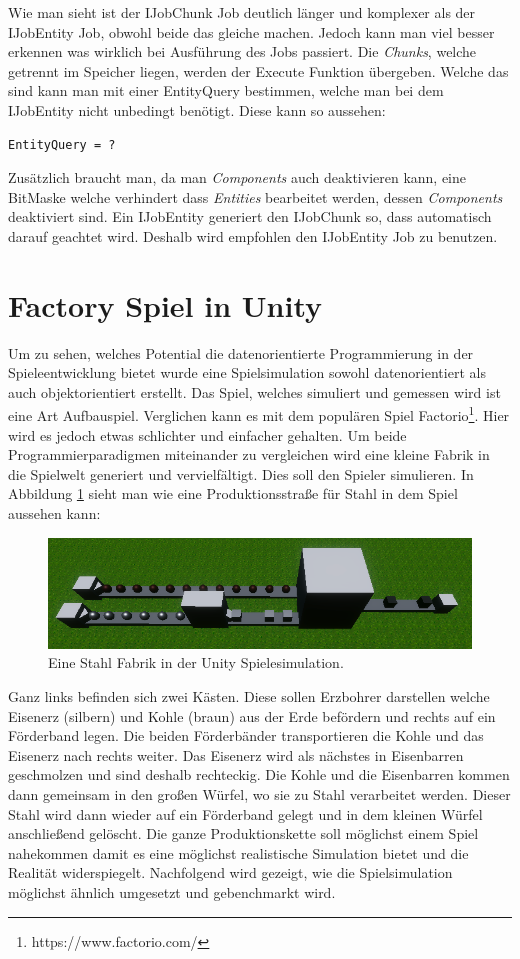 \documentclass[12pt, titlepage]{article}
\DeclareRobustCommand{\#}{\adjustbox{valign=B,totalheight=.57\baselineskip}{\oldhash}}%
\begin{document}
Wie man sieht ist der IJobChunk Job deutlich länger und komplexer als der IJobEntity Job, obwohl beide das gleiche machen. Jedoch kann man viel besser erkennen was wirklich bei Ausführung des Jobs passiert. Die \textit{Chunks}, welche getrennt im Speicher liegen, werden der Execute Funktion übergeben. Welche das sind kann man mit einer EntityQuery bestimmen, welche man bei dem IJobEntity nicht unbedingt benötigt. Diese kann so aussehen:
\begin{lstlisting}[style=code, caption={EntityQuery Beispiel}, label=EntityQuery]
EntityQuery = ?
\end{lstlisting}
Zusätzlich braucht man, da man \textit{Components} auch deaktivieren kann, eine BitMaske welche verhindert dass \textit{Entities} bearbeitet werden, dessen \textit{Components} deaktiviert sind. Ein IJobEntity generiert den IJobChunk so, dass automatisch darauf geachtet wird. Deshalb wird empfohlen den IJobEntity Job zu benutzen.
\newpage
\section{Factory Spiel in Unity}
Um zu sehen, welches Potential die datenorientierte Programmierung in der Spieleentwicklung bietet wurde eine Spielsimulation sowohl datenorientiert als auch objektorientiert erstellt. Das Spiel, welches simuliert und gemessen wird ist eine Art Aufbauspiel. Verglichen kann es mit dem populären Spiel Factorio\footnote{https://www.factorio.com/}. Hier wird es jedoch etwas schlichter und einfacher gehalten. Um beide Programmierparadigmen miteinander zu vergleichen wird eine kleine Fabrik in die Spielwelt generiert und vervielfältigt. Dies soll den Spieler simulieren. In Abbildung \ref{fig:steel} sieht man wie eine Produktionsstraße für Stahl in dem Spiel aussehen kann:
\begin{figure}[H]
\includegraphics[scale=0.87]{Bilder/Stahl Fabrik.png}
\caption{Eine Stahl Fabrik in der Unity Spielesimulation.}
\label{fig:steel}
\end{figure}
Ganz links befinden sich zwei Kästen. Diese sollen Erzbohrer darstellen welche Eisenerz (silbern) und Kohle (braun) aus der Erde befördern und rechts auf ein Förderband legen. Die beiden Förderbänder transportieren die Kohle und das Eisenerz nach rechts weiter. Das Eisenerz wird als nächstes in Eisenbarren geschmolzen und sind deshalb rechteckig. Die Kohle und die Eisenbarren kommen dann gemeinsam in den großen Würfel, wo sie zu Stahl verarbeitet werden. Dieser Stahl wird dann wieder auf ein Förderband gelegt und in dem kleinen Würfel anschließend gelöscht. Die ganze Produktionskette soll möglichst einem Spiel nahekommen damit es eine möglichst realistische Simulation bietet und die Realität widerspiegelt. Nachfolgend wird gezeigt, wie die Spielsimulation möglichst ähnlich umgesetzt und gebenchmarkt wird.
\end{document}

